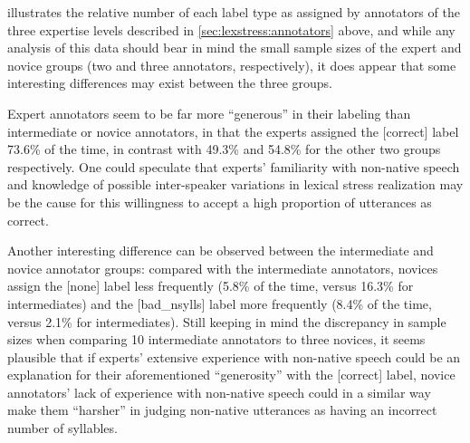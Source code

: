 		
%	
%			
%			
%			
		
			 illustrates the relative number of each label type as assigned by annotators of the three expertise levels described in \cref{sec:lexstress:annotators} above, and while any analysis of this data should bear in mind the small sample sizes of the expert and novice groups (two and three annotators, respectively), it does appear that some interesting differences may exist between the three groups. 
			
			Expert annotators seem to be far more ``generous'' in their labeling than intermediate or novice annotators, in that the experts assigned the [correct] label 73.6\% of the time, in contrast with 49.3\% and 54.8\% for the other two groups respectively. One could speculate that experts' familiarity with non-native speech and knowledge of possible inter-speaker variations in lexical stress realization may be the cause for this willingness to accept a high proportion of utterances as correct. 
			
			Another interesting difference can be observed between the intermediate and novice annotator groups: compared with the intermediate annotators, novices assign the [none] label less frequently (5.8\% of the time, versus 16.3\% for intermediates) and the [bad\_nsylls] label more frequently (8.4\% of the time, versus 2.1\% for intermediates). Still keeping in mind the discrepancy in sample sizes when comparing 10 intermediate annotators to three novices, 
			it seems plausible that if experts' extensive experience with non-native speech could be an explanation for their aforementioned ``generosity'' with the [correct] label, novice annotators' lack of experience with non-native speech could in a similar way make them ``harsher'' in judging non-native utterances as having an incorrect number of syllables. 
			
